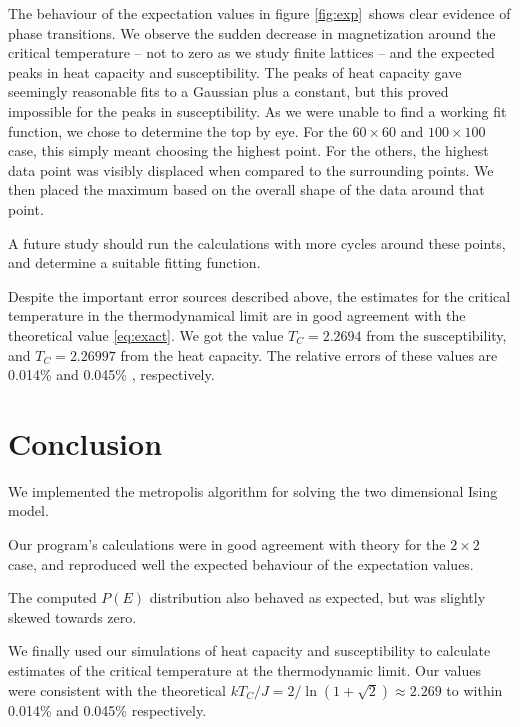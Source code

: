 \documentclass[a4paper,10pt,onecolumn]{article}
\begin{document}
The behaviour of the expectation values in figure \ref{fig:exp} shows clear evidence of phase transitions. We observe the sudden decrease in magnetization around the critical temperature – not to zero as we study finite lattices – and the expected peaks in heat capacity and susceptibility. 
The peaks of heat capacity gave seemingly reasonable fits to a Gaussian plus a constant, but this proved impossible for the peaks in susceptibility. 
As we were unable to find a working fit function, we chose to determine the top by eye. For the $60\times60$ and $100\times100$ case, this simply meant choosing the highest point. 
For the others, the highest data point was visibly displaced when compared to the surrounding points. We then placed the maximum based on the overall shape of the data around that point.
 
A future study should run the calculations with more cycles around these points, and determine a suitable fitting function.

Despite the important error sources described above, the estimates for the critical temperature in the thermodynamical limit are in good agreement with the theoretical value \ref{eq:exact}. We got the value $T_C = 2.2694$ from the susceptibility, and $T_C = 2.26997$ from the  heat capacity. The relative errors of these values are 0.014\% and 0.045\% , respectively.    


%
%
%
\section{Conclusion}
We implemented the metropolis algorithm for solving the two dimensional Ising model. 

Our program's calculations were in good agreement with theory for the $2\times2$ case, and reproduced well the expected behaviour of the expectation values. 

The computed $P(E)$ distribution also behaved as expected, but was slightly skewed towards zero. 

We finally used our simulations of heat capacity and susceptibility to calculate estimates of the critical temperature at the thermodynamic limit. Our values were consistent with the theoretical $kT_C/J = 2/\ln(1+\sqrt{2}) \approx 2.269$ to within 0.014\% and 0.045\% respectively. 
\end{document}

